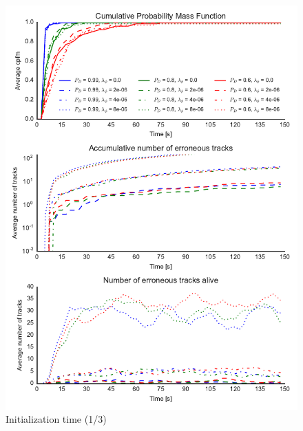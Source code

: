 \begin{figure}
\centering
\includegraphics{Figures/plots/Scenario0_Init-Time(1-3).pdf}
\caption{Initialization time (1/3)}\label{fig:init_time_1-3}
\end{figure}

